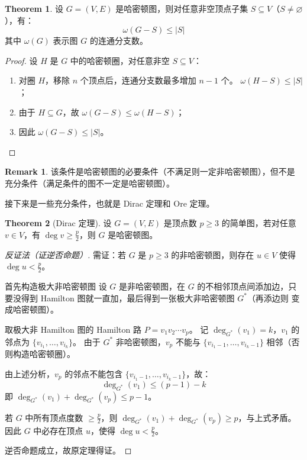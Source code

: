 \documentclass[oneside]{book}
\theoremstyle{definition}
\newtheorem{theorem}{Theorem}[section]
\newtheorem{remark}{Remark}[section]
\begin{document}
\begin{theorem}
	设 \( G = (V, E) \) 是哈密顿图，则对任意非空顶点子集 \( S \subseteq V \)（\( S \neq \varnothing \)），有：
	\[
	\omega(G - S) \leq |S|
	\]
	其中 \( \omega(G ) \) 表示图 \( G \) 的连通分支数。
\end{theorem}

\begin{proof}
	设 \( H \) 是 \( G \) 中的哈密顿圈，对任意非空 \( S \subseteq V \)：
	\begin{enumerate}
		\item 对圈 \( H \)，移除 \( n \) 个顶点后，连通分支数最多增加 \(n-1\) 个。 \( \omega(H - S) \leq |S| \)；
		\item 由于 \( H \subseteq G \)，故 \( \omega(G - S) \leq \omega(H - S) \)；
		\item 因此 \( \omega(G - S) \leq |S| \)。
	\end{enumerate}
\end{proof}

\begin{remark}
	该条件是哈密顿图的必要条件（不满足则一定非哈密顿图），但不是充分条件（满足条件的图不一定是哈密顿图）。
\end{remark}


接下来是一些充分条件，也就是 Dirac 定理和 Ore 定理。

\begin{theorem}[Dirac 定理]
	设 \( G = (V, E) \) 是顶点数 \( p \geq 3 \) 的简单图，若对任意 \( v \in V \)，有 \( \deg v \geq \frac{p}{2} \)，则 \( G \) 是哈密顿图。
\end{theorem}

\begin{proof}[反证法（证逆否命题）]
	需证：若 \( G \) 是 \( p \geq 3 \) 的非哈密顿图，则存在 \( u \in V \) 使得 \( \deg u < \frac{p}{2} \)。

	首先构造极大非哈密顿图
	设 \( G \) 是非哈密顿图，在 \( G \) 的不相邻顶点间添加边，只要没得到 Hamilton 图就一直加，最后得到一张极大非哈密顿图 \( G^* \)（再添边则 变成哈密顿图）。
	
	取极大非 Hamilton 图的 Hamilton 路 \( P = v_1v_2\cdots v_p \)。
	记 \( \deg_{G^*}(v_1) = k \)，\( v_1 \) 的邻点为 \( \{v_{i_1}, \dots, v_{i_k}\} \)。
	由于 \( G^* \) 非哈密顿图，\( v_p \) 不能与 \( \{v_{i_1-1}, \dots, v_{i_k-1}\} \) 相邻（否则构造哈密顿圈）。
	

	由上述分析，\( v_p \) 的邻点不能包含 \( \{v_{i_1-1}, \dots, v_{i_k-1}\} \)，故：
	\[
	\deg_{G^*}(v_1) \leq (p-1) - k
	\]
	即 \( \deg_{G^*}(v_1) + \deg_{G^*}(v_p) \leq p-1 \)。
	
	若 \( G \) 中所有顶点度数 \( \geq \frac{p}{2} \)，则 \( \deg_{G^*}(v_1) + \deg_{G^*}(v_p) \geq p \)，与上式矛盾。
	因此 \( G \) 中必存在顶点 \( u \)，使得 \( \deg u < \frac{p}{2} \)。
	
	
	\medskip
	逆否命题成立，故原定理得证。
\end{proof}
\end{document}
